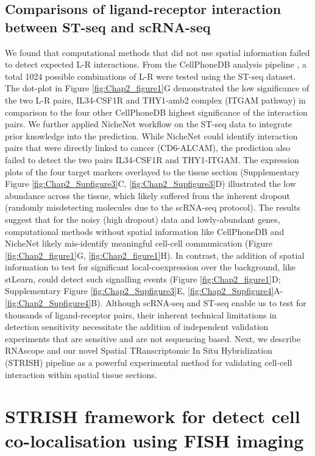 \subsection{Comparisons of ligand-receptor interaction between ST-seq and scRNA-seq}
We found that computational methods that did not use spatial information failed to detect expected L-R interactions. From the CellPhoneDB analysis pipeline \cite{efremova2020cellphonedb}, a total 1024 possible combinations of L-R were tested using the ST-seq dataset. The dot-plot in Figure \ref{fig:Chap2_figure1}G demonstrated the low significance of the two L-R pairs, IL34-CSF1R and THY1-amb2 complex (ITGAM pathway) in comparison to the four other CellPhoneDB highest significance of the interaction pairs. We further applied NicheNet \cite{browaeys2020nichenet} workflow on the ST-seq data to integrate prior knowledge into the prediction. While NicheNet could identify interaction pairs that were directly linked to cancer (\ie CD6-ALCAM), the prediction also failed to detect the two pairs IL34-CSF1R and THY1-ITGAM. The expression plots of the four target markers overlayed to the tissue section (Supplementary Figure \ref{fig:Chap2_Supfigure3}C, \ref{fig:Chap2_Supfigure3}D) illustrated the low abundance across the tissue, which likely suffered from the inherent dropout (randomly misdetecting molecules due to the scRNA-seq protocol). The results suggest that for the noisy (high dropout) data and lowly-abundant genes, computational methods without spatial information like CellPhoneDB and NicheNet likely mis-identify meaningful cell-cell communication (Figure \ref{fig:Chap2_figure1}G, \ref{fig:Chap2_figure1}H). In contrast, the addition of spatial information to test for significant local-coexpression over the background, like stLearn, could detect such signalling events (Figure \ref{fig:Chap2_figure1}D; Supplementary Figure \ref{fig:Chap2_Supfigure3}E,  \ref{fig:Chap2_Supfigure4}A-\ref{fig:Chap2_Supfigure4}B). Although scRNA-seq and ST-seq enable us to test for thousands of ligand-receptor pairs, their inherent technical limitations in detection sensitivity necessitate the addition of independent validation experiments that are sensitive and are not sequencing based. Next, we describe RNAscope and our novel Spatial TRanscriptomic In Situ Hybridization (STRISH) pipeline as a powerful experimental method for validating cell-cell interaction within spatial tissue sections. 

\section{STRISH framework for detect cell co-localisation using FISH imaging}
\label{Sec:2.2_STRISH}	%

